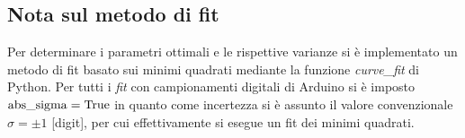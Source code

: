 \documentclass{article}[a4paper, oneside ,11pt]
\begin{document}
\subsection*{Nota sul metodo di fit}
Per determinare i parametri ottimali e le rispettive varianze si \`e implementato un metodo di fit basato sui minimi quadrati mediante la funzione \emph{curve\_fit} di Python.
Per tutti i \emph{fit} con campionamenti digitali di Arduino si è imposto $\rm{abs\_sigma} = \rm True$ in quanto come incertezza si è assunto il valore convenzionale $\sigma = \pm 1$ [digit], per cui effettivamente si esegue un fit dei minimi quadrati.\\
\pagebreak


\end{document}
